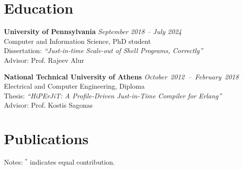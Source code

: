 \documentclass[margin]{res}
\begin{document}
\begin{resume}
\section{Education}
\hypertarget{sec:education}{}

\textbf{University of Pennsylvania} \hfill {\em September 2018 -- July 2024}\\
Computer and Information Science, PhD student \\
Dissertation: \textit{``Just-in-time Scale-out of Shell Programs, Correctly''} \\
Advisor: Prof. Rajeev Alur


\textbf{National Technical University of Athens} \hfill \mbox{\em October 2012 -- February 2018}\\
Electrical and Computer Engineering, Diploma \\ %
Thesis: \textit{``HiPErJiT: A Profile-Driven Just-in-Time Compiler for Erlang''} \\
Advisor: Prof. Kostis Sagonas 





\section{Publications}
\hypertarget{sec:publications}{}



Notes: $^*$ indicates equal contribution.


\end{resume}
\end{document}
